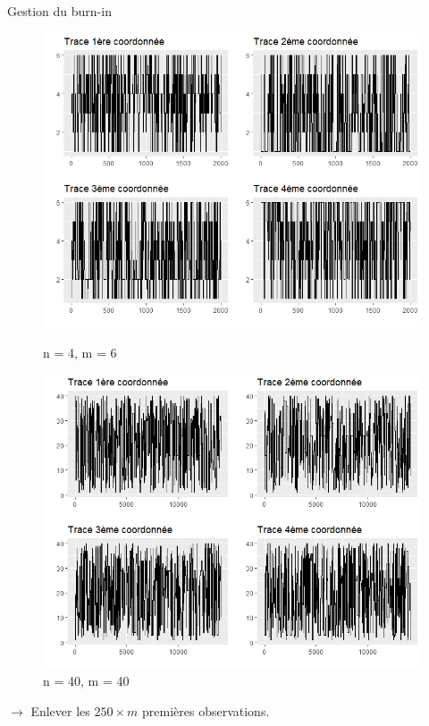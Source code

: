 \documentclass[10pt,xcolor=table,color={dvipsnames,usenames},ignorenonframetext,usepdftitle=false,french]{beamer}
\begin{document}
\begin{frame}{Gestion du burn-in}
\protect\hypertarget{gestion-du-burn-in}{}

\begin{figure}
\begin{minipage}{.5\textwidth}
\includegraphics[width=1\textwidth]{img/n_4_m_6.png}
\captionsetup{margin=0cm,format=hang,justification=justified}
\caption{n = 4, m = 6}
\end{minipage}%
\begin{minipage}{.5\textwidth}
\includegraphics[width=1\textwidth]{img/n_40_m_40.png}
\captionsetup{margin=0cm,format=hang,justification=justified}
\caption{n = 40, m = 40}
\end{minipage}
\end{figure}

\bigskip

\bigskip

\(\longrightarrow\) Enlever les \(250\times m\) premières observations.

\end{frame}
\end{document}
